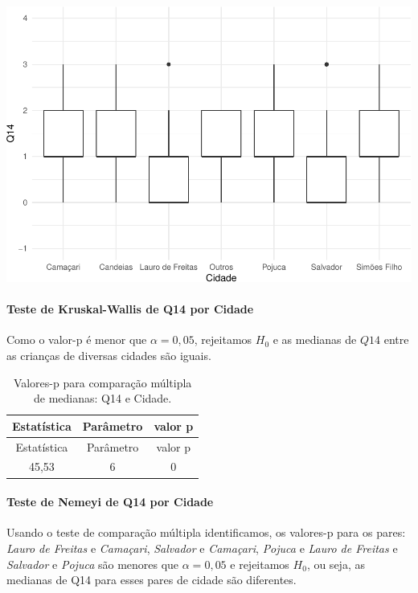 \documentclass[]{article}
\let\oldparagraph\paragraph
\renewcommand{\paragraph}[1]{\oldparagraph{#1}\mbox{}}
\begin{document}
\begin{center}\includegraphics[width=0.75\linewidth]{relatorio_files/figure-latex/unnamed-chunk-64-1} \end{center}

\hypertarget{teste-de-kruskal-wallis-de-q14-por-cidade}{%
\paragraph{Teste de Kruskal-Wallis de Q14 por Cidade}\label{teste-de-kruskal-wallis-de-q14-por-cidade}}

Como o valor-p é menor que \(\alpha=0,05\), rejeitamos \(H_0\) e as medianas de \(Q14\) entre as crianças de diversas cidades são iguais.

\begin{longtable}[]{@{}ccc@{}}
\caption{\label{tab:unnamed-chunk-65}Valores-p para comparação múltipla de medianas: Q14 e Cidade.}\tabularnewline
\toprule
Estatística & Parâmetro & valor p\tabularnewline
\midrule
\endfirsthead
\toprule
Estatística & Parâmetro & valor p\tabularnewline
\midrule
\endhead
45,53 & 6 & 0\tabularnewline
\bottomrule
\end{longtable}

\hypertarget{teste-de-nemeyi-de-q14-por-cidade}{%
\paragraph{Teste de Nemeyi de Q14 por Cidade}\label{teste-de-nemeyi-de-q14-por-cidade}}

Usando o teste de comparação múltipla identificamos, os valores-p para os pares: \emph{Lauro de Freitas} e \emph{Camaçari}, \emph{Salvador} e \emph{Camaçari}, \emph{Pojuca} e \emph{Lauro de Freitas} e \emph{Salvador} e \emph{Pojuca} são menores que \(\alpha=0,05\) e rejeitamos \(H_0\), ou seja, as medianas de Q14 para esses pares de cidade são diferentes.
\end{document}
